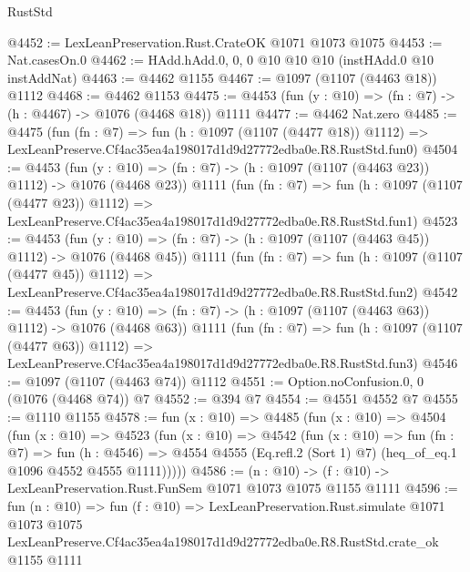 \begin{lexlean}{RustStd}
\begin{coremodule}
@4452 := LexLeanPreservation.Rust.CrateOK @1071 @1073 @1075
@4453 := Nat.casesOn.{0}
@4462 := HAdd.hAdd.{0, 0, 0} @10 @10 @10 (instHAdd.{0} @10 instAddNat)
@4463 := @4462 @1155
@4467 := @1097 (@1107 (@4463 @18)) @1112
@4468 := @4462 @1153
@4475 := @4453 (fun (y : @10) => (fn : @7) -> (h : @4467) -> @1076 (@4468 @18)) @1111
@4477 := @4462 Nat.zero
@4485 := @4475
    (fun (fn : @7) =>
    fun (h : @1097 (@1107 (@4477 @18)) @1112) =>
    LexLeanPreserve.Cf4ac35ea4a198017d1d9d27772edba0e.R8.RustStd.fun0)
@4504 := @4453
    (fun (y : @10) => (fn : @7) -> (h : @1097 (@1107 (@4463 @23)) @1112) -> @1076 (@4468 @23))
    @1111
    (fun (fn : @7) =>
    fun (h : @1097 (@1107 (@4477 @23)) @1112) =>
    LexLeanPreserve.Cf4ac35ea4a198017d1d9d27772edba0e.R8.RustStd.fun1)
@4523 := @4453
    (fun (y : @10) => (fn : @7) -> (h : @1097 (@1107 (@4463 @45)) @1112) -> @1076 (@4468 @45))
    @1111
    (fun (fn : @7) =>
    fun (h : @1097 (@1107 (@4477 @45)) @1112) =>
    LexLeanPreserve.Cf4ac35ea4a198017d1d9d27772edba0e.R8.RustStd.fun2)
@4542 := @4453
    (fun (y : @10) => (fn : @7) -> (h : @1097 (@1107 (@4463 @63)) @1112) -> @1076 (@4468 @63))
    @1111
    (fun (fn : @7) =>
    fun (h : @1097 (@1107 (@4477 @63)) @1112) =>
    LexLeanPreserve.Cf4ac35ea4a198017d1d9d27772edba0e.R8.RustStd.fun3)
@4546 := @1097 (@1107 (@4463 @74)) @1112
@4551 := Option.noConfusion.{0, 0} (@1076 (@4468 @74)) @7
@4552 := @394 @7
@4554 := @4551 @4552 @7
@4555 := @1110 @1155
@4578 := fun (x : @10) =>
  @4485
    (fun (x : @10) =>
    @4504
      (fun (x : @10) =>
      @4523
        (fun (x : @10) =>
        @4542
          (fun (x : @10) =>
          fun (fn : @7) =>
          fun (h : @4546) =>
          @4554 @4555 (Eq.refl.{2} (Sort 1) @7) (heq_of_eq.{1} @1096 @4552 @4555 @1111)))))
@4586 := (n : @10) -> (f : @10) -> LexLeanPreservation.Rust.FunSem @1071 @1073 @1075 @1155 @1111
@4596 := fun (n : @10) =>
  fun (f : @10) =>
  LexLeanPreservation.Rust.simulate
    @1071
    @1073
    @1075
    LexLeanPreserve.Cf4ac35ea4a198017d1d9d27772edba0e.R8.RustStd.crate_ok
    @1155
    @1111
\end{coremodule}
\end{lexlean}

